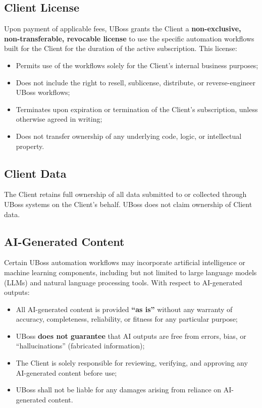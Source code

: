\documentclass[11pt,letterpaper,parskip=half]{scrartcl}
\begin{document}
\subsection{Client License}

Upon payment of applicable fees, UBoss grants the Client a \textbf{non-exclusive, non-transferable, revocable license} to use the specific automation workflows built for the Client for the duration of the active subscription. This license:

\begin{itemize}[nosep, leftmargin=1.5em]
    \item Permits use of the workflows solely for the Client's internal business purposes;
    \item Does not include the right to resell, sublicense, distribute, or reverse-engineer UBoss workflows;
    \item Terminates upon expiration or termination of the Client's subscription, unless otherwise agreed in writing;
    \item Does not transfer ownership of any underlying code, logic, or intellectual property.
\end{itemize}

\subsection{Client Data}

The Client retains full ownership of all data submitted to or collected through UBoss systems on the Client's behalf. UBoss does not claim ownership of Client data.

\subsection{AI-Generated Content}

\begin{tcolorbox}[keyterm, title={AI Disclaimer}]
Certain UBoss automation workflows may incorporate artificial intelligence or machine learning components, including but not limited to large language models (LLMs) and natural language processing tools. With respect to AI-generated outputs:
\begin{itemize}[nosep, leftmargin=1.5em]
    \item All AI-generated content is provided \textbf{``as is''} without any warranty of accuracy, completeness, reliability, or fitness for any particular purpose;
    \item UBoss \textbf{does not guarantee} that AI outputs are free from errors, bias, or ``hallucinations'' (fabricated information);
    \item The Client is solely responsible for reviewing, verifying, and approving any AI-generated content before use;
    \item UBoss shall not be liable for any damages arising from reliance on AI-generated content.
\end{itemize}
\end{tcolorbox}
\end{document}
